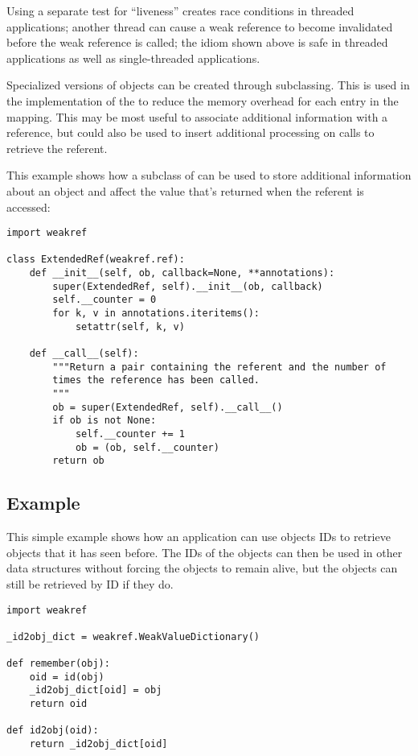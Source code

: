 Using a separate test for ``liveness'' creates race conditions in
threaded applications; another thread can cause a weak reference to
become invalidated before the weak reference is called; the
idiom shown above is safe in threaded applications as well as
single-threaded applications.

Specialized versions of  objects can be created through
subclassing.  This is used in the implementation of the
 to reduce the memory overhead for each
entry in the mapping.  This may be most useful to associate additional
information with a reference, but could also be used to insert
additional processing on calls to retrieve the referent.

This example shows how a subclass of  can be used to store
additional information about an object and affect the value that's
returned when the referent is accessed:

\begin{verbatim}
import weakref

class ExtendedRef(weakref.ref):
    def __init__(self, ob, callback=None, **annotations):
        super(ExtendedRef, self).__init__(ob, callback)
        self.__counter = 0
        for k, v in annotations.iteritems():
            setattr(self, k, v)

    def __call__(self):
        """Return a pair containing the referent and the number of
        times the reference has been called.
        """
        ob = super(ExtendedRef, self).__call__()
        if ob is not None:
            self.__counter += 1
            ob = (ob, self.__counter)
        return ob
\end{verbatim}


\subsection{Example \label{weakref-example}}

This simple example shows how an application can use objects IDs to
retrieve objects that it has seen before.  The IDs of the objects can
then be used in other data structures without forcing the objects to
remain alive, but the objects can still be retrieved by ID if they
do.

\begin{verbatim}
import weakref

_id2obj_dict = weakref.WeakValueDictionary()

def remember(obj):
    oid = id(obj)
    _id2obj_dict[oid] = obj
    return oid

def id2obj(oid):
    return _id2obj_dict[oid]
\end{verbatim}


